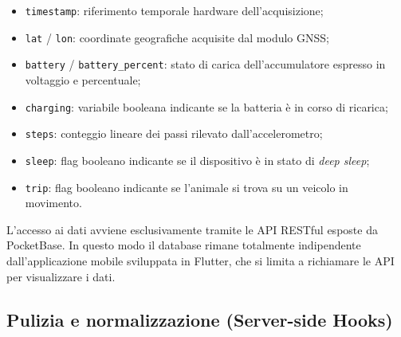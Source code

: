 \documentclass[12pt,a4paper]{article}
\begin{document}
\begin{itemize}
    \item \texttt{timestamp}: riferimento temporale hardware dell'acquisizione;
    \item \texttt{lat} / \texttt{lon}: coordinate geografiche acquisite dal modulo GNSS;
    \item \texttt{battery} / \texttt{battery\_percent}: stato di carica dell'accumulatore espresso in voltaggio e percentuale;
    \item \texttt{charging}: variabile booleana indicante se la batteria è in corso di ricarica;
    \item \texttt{steps}: conteggio lineare dei passi rilevato dall'accelerometro;
    \item \texttt{sleep}: flag booleano indicante se il dispositivo è in stato di \textit{deep sleep};
    \item \texttt{trip}: flag booleano indicante se l'animale si trova su un veicolo in movimento.
\end{itemize}

L'accesso ai dati avviene esclusivamente tramite le API RESTful esposte da PocketBase. 
In questo modo il database rimane totalmente indipendente dall'applicazione mobile sviluppata in Flutter, 
che si limita a richiamare le API per visualizzare i dati.

\subsection{Pulizia e normalizzazione (Server-side Hooks)}
\end{document}

